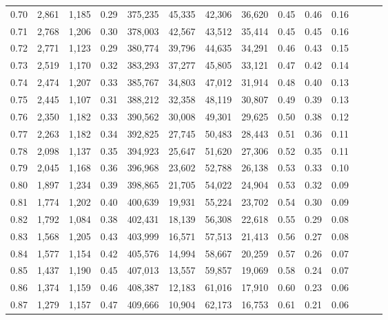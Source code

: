 \begin{tabular}{rrrrrrrrrrrrrr}
0.70 &   2,861 &  1,185 &  0.29 &  375,235 &   45,335 &  42,306 &  36,620 &  0.45 &  0.46 &      0.16 \\
0.71 &   2,768 &  1,206 &  0.30 &  378,003 &   42,567 &  43,512 &  35,414 &  0.45 &  0.45 &      0.16 \\
0.72 &   2,771 &  1,123 &  0.29 &  380,774 &   39,796 &  44,635 &  34,291 &  0.46 &  0.43 &      0.15 \\
0.73 &   2,519 &  1,170 &  0.32 &  383,293 &   37,277 &  45,805 &  33,121 &  0.47 &  0.42 &      0.14 \\
0.74 &   2,474 &  1,207 &  0.33 &  385,767 &   34,803 &  47,012 &  31,914 &  0.48 &  0.40 &      0.13 \\
0.75 &   2,445 &  1,107 &  0.31 &  388,212 &   32,358 &  48,119 &  30,807 &  0.49 &  0.39 &      0.13 \\
0.76 &   2,350 &  1,182 &  0.33 &  390,562 &   30,008 &  49,301 &  29,625 &  0.50 &  0.38 &      0.12 \\
0.77 &   2,263 &  1,182 &  0.34 &  392,825 &   27,745 &  50,483 &  28,443 &  0.51 &  0.36 &      0.11 \\
0.78 &   2,098 &  1,137 &  0.35 &  394,923 &   25,647 &  51,620 &  27,306 &  0.52 &  0.35 &      0.11 \\
0.79 &   2,045 &  1,168 &  0.36 &  396,968 &   23,602 &  52,788 &  26,138 &  0.53 &  0.33 &      0.10 \\
0.80 &   1,897 &  1,234 &  0.39 &  398,865 &   21,705 &  54,022 &  24,904 &  0.53 &  0.32 &      0.09 \\
0.81 &   1,774 &  1,202 &  0.40 &  400,639 &   19,931 &  55,224 &  23,702 &  0.54 &  0.30 &      0.09 \\
0.82 &   1,792 &  1,084 &  0.38 &  402,431 &   18,139 &  56,308 &  22,618 &  0.55 &  0.29 &      0.08 \\
0.83 &   1,568 &  1,205 &  0.43 &  403,999 &   16,571 &  57,513 &  21,413 &  0.56 &  0.27 &      0.08 \\
0.84 &   1,577 &  1,154 &  0.42 &  405,576 &   14,994 &  58,667 &  20,259 &  0.57 &  0.26 &      0.07 \\
0.85 &   1,437 &  1,190 &  0.45 &  407,013 &   13,557 &  59,857 &  19,069 &  0.58 &  0.24 &      0.07 \\
0.86 &   1,374 &  1,159 &  0.46 &  408,387 &   12,183 &  61,016 &  17,910 &  0.60 &  0.23 &      0.06 \\
0.87 &   1,279 &  1,157 &  0.47 &  409,666 &   10,904 &  62,173 &  16,753 &  0.61 &  0.21 &      0.06 \\

\end{tabular}
